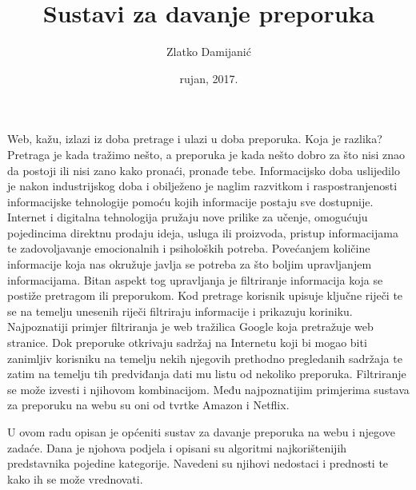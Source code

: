 \documentclass[a4paper,oneside,12pt]{memoir} %
\title{Sustavi za davanje preporuka}
\author{Zlatko Damijanić}
\date{rujan, 2017.}  %
\begin{document}
\renewcommand\thelstlisting{\arabic{chapter}.\arabic{lstlisting}.}

\frontmatter


\begin{intro}
Web, kažu, izlazi iz doba pretrage i ulazi u doba preporuka. Koja je razlika? Pretraga je kada tražimo nešto, a preporuka je kada nešto dobro za što nisi znao da postoji ili nisi zano kako pronaći, pronađe tebe. Informacijsko doba uslijedilo je nakon industrijskog doba i obilježeno je naglim razvitkom i raspostranjenosti informacijske tehnologije pomoću kojih informacije postaju sve dostupnije. Internet i digitalna tehnologija pružaju nove prilike za učenje, omogućuju pojedincima direktnu prodaju ideja, usluga ili proizvoda, pristup informacijama te zadovoljavanje emocionalnih i psiholoških potreba. Povećanjem količine informacije koja nas okružuje javlja se potreba za što boljim upravljanjem informacijama. Bitan aspekt tog upravljanja je filtriranje informacija koja se postiže pretragom ili preporukom. Kod pretrage korisnik upisuje ključne riječi te se na temelju unesenih riječi filtriraju informacije i prikazuju koriniku. Najpoznatiji primjer filtriranja je web tražilica Google koja pretražuje web stranice. Dok preporuke otkrivaju sadržaj na Internetu koji bi mogao biti zanimljiv korisniku na temelju nekih njegovih prethodno pregledanih sadržaja te zatim na temelju tih predviđanja dati mu listu od nekoliko preporuka. Filtriranje se može izvesti i njihovom kombinacijom. Među najpoznatijim primjerima sustava za  preporuku na webu su oni od tvrtke Amazon i Netflix.
\par 
U ovom radu opisan je općeniti sustav za davanje preporuka na webu i njegove zadaće. Dana je njohova podjela i opisani su algoritmi najkorištenijih predstavnika pojedine kategorije. Navedeni su njihovi nedostaci i prednosti te kako ih se može vrednovati.
\end{intro}
\end{document}
